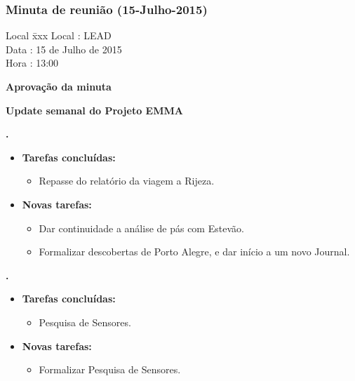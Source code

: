 \subsubsection{Minuta de reunião (15-Julho-2015)}

\begin{tabbing}
  Local \= xxx \kill
  Local \> : LEAD \\
  Data  \> : 15 de Julho de 2015 \\
  Hora  \> : 13:00
\end{tabbing}


\textbf{Aprovação da minuta}

\textbf{Update semanal do Projeto EMMA}

  
\textbf{\renan.} 
	\begin{itemize}
		\item \textbf{Tarefas concluídas:}
			\begin{itemize}    
				\item Repasse do relatório da viagem a Rijeza.
			\end{itemize}
		
		\item \textbf{Novas tarefas:}
			\begin{itemize} 
				\item Dar continuidade a análise de pás com Estevão.
				\item Formalizar descobertas de Porto Alegre, e dar início a um novo
				Journal.
			\end{itemize}
	\end{itemize}
		
\textbf{\elael.} 
	\begin{itemize}
		\item \textbf{Tarefas concluídas:}
			\begin{itemize}    
				\item Pesquisa de Sensores.
			\end{itemize}
		
		\item \textbf{Novas tarefas:}
			\begin{itemize} 
				\item Formalizar Pesquisa de Sensores.
			\end{itemize}
	\end{itemize}
					
